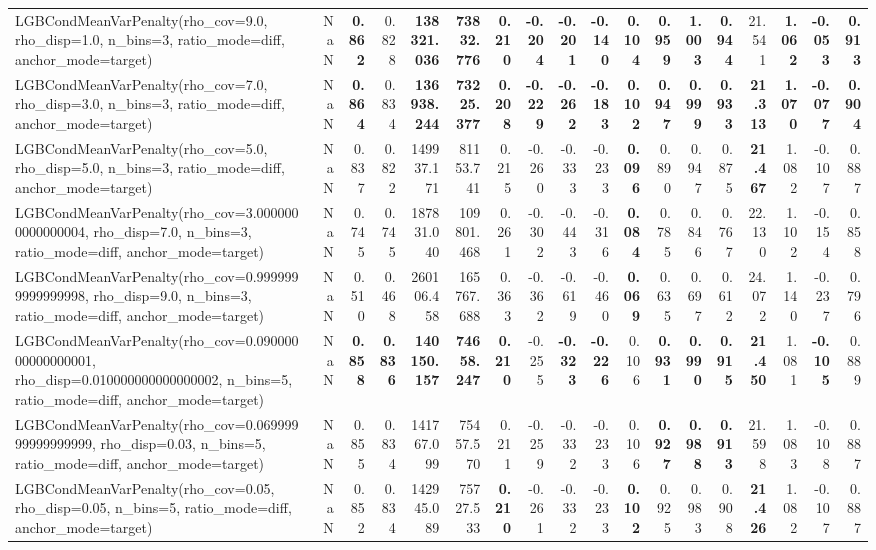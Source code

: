\documentclass[11pt]{article}
\theoremstyle{plain}
\theoremstyle{definition}
\newcommand{\1}{\mathbf{1}}
\begin{document}
\begin{table}[htbp]
{\begin{tabular}{lrrrrrrrrrrrrrrrrr}
LGBCondMeanVarPenalty(rho\_cov=9.0, rho\_disp=1.0, n\_bins=3, ratio\_mode=diff, anchor\_mode=target) & NaN & \textbf{0.862} & 0.828 & \textbf{138321.036} & \textbf{73832.776} & \textbf{0.210} & \textbf{-0.204} & \textbf{-0.201} & \textbf{-0.140} & \textbf{0.104} & \textbf{0.959} & \textbf{1.003} & \textbf{0.944} & 21.541 & \textbf{1.062} & \textbf{-0.053} & \textbf{0.913} \\
LGBCondMeanVarPenalty(rho\_cov=7.0, rho\_disp=3.0, n\_bins=3, ratio\_mode=diff, anchor\_mode=target) & NaN & \textbf{0.864} & 0.834 & \textbf{136938.244} & \textbf{73225.377} & \textbf{0.208} & \textbf{-0.229} & \textbf{-0.262} & \textbf{-0.183} & \textbf{0.102} & \textbf{0.947} & \textbf{0.999} & \textbf{0.933} & \textbf{21.313} & \textbf{1.070} & \textbf{-0.077} & \textbf{0.904} \\
LGBCondMeanVarPenalty(rho\_cov=5.0, rho\_disp=5.0, n\_bins=3, ratio\_mode=diff, anchor\_mode=target) & NaN & 0.837 & 0.822 & 149937.171 & 81153.741 & 0.215 & -0.260 & -0.333 & -0.233 & \textbf{0.096} & 0.890 & 0.947 & 0.875 & \textbf{21.467} & 1.082 & -0.107 & 0.887 \\
LGBCondMeanVarPenalty(rho\_cov=3.0000000000000004, rho\_disp=7.0, n\_bins=3, ratio\_mode=diff, anchor\_mode=target) & NaN & 0.745 & 0.745 & 187831.040 & 109801.468 & 0.261 & -0.302 & -0.443 & -0.316 & \textbf{0.084} & 0.785 & 0.846 & 0.767 & 22.130 & 1.102 & -0.154 & 0.858 \\
LGBCondMeanVarPenalty(rho\_cov=0.9999999999999998, rho\_disp=9.0, n\_bins=3, ratio\_mode=diff, anchor\_mode=target) & NaN & 0.510 & 0.468 & 260106.458 & 165767.688 & 0.363 & -0.362 & -0.619 & -0.460 & \textbf{0.069} & 0.635 & 0.697 & 0.612 & 24.072 & 1.140 & -0.237 & 0.796 \\
LGBCondMeanVarPenalty(rho\_cov=0.09000000000000001, rho\_disp=0.010000000000000002, n\_bins=5, ratio\_mode=diff, anchor\_mode=target) & NaN & \textbf{0.858} & \textbf{0.836} & \textbf{140150.157} & \textbf{74658.247} & \textbf{0.210} & -0.255 & \textbf{-0.323} & \textbf{-0.226} & 0.106 & \textbf{0.931} & \textbf{0.990} & \textbf{0.915} & \textbf{21.450} & 1.081 & \textbf{-0.105} & 0.889 \\
LGBCondMeanVarPenalty(rho\_cov=0.06999999999999999, rho\_disp=0.03, n\_bins=5, ratio\_mode=diff, anchor\_mode=target) & NaN & 0.855 & 0.834 & 141767.099 & 75457.570 & 0.211 & -0.259 & -0.332 & -0.233 & 0.106 & \textbf{0.927} & \textbf{0.988} & \textbf{0.913} & 21.598 & 1.083 & -0.108 & 0.887 \\
LGBCondMeanVarPenalty(rho\_cov=0.05, rho\_disp=0.05, n\_bins=5, ratio\_mode=diff, anchor\_mode=target) & NaN & 0.852 & 0.834 & 142945.089 & 75727.533 & \textbf{0.210} & -0.261 & -0.332 & -0.233 & \textbf{0.102} & 0.925 & 0.983 & 0.908 & \textbf{21.426} & 1.082 & -0.107 & 0.887 \\

\end{tabular}}
\end{table}
\end{document}
